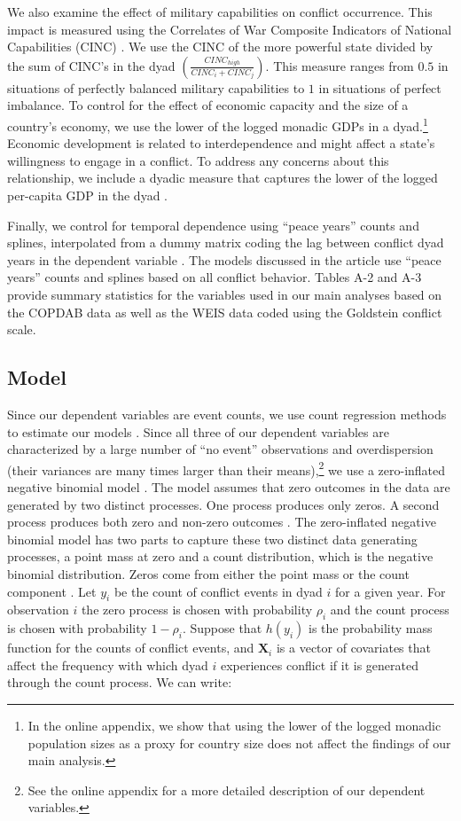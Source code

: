 \documentclass[12pt]{article}
\theoremstyle{hypothesis}
\begin{document}
We also examine the effect of military capabilities on conflict occurrence. This impact is measured using the Correlates of War Composite Indicators of National Capabilities (CINC) \citep{Singer:1987}. We use the CINC of the more powerful state divided by the sum of CINC's in the dyad $\left(\frac{CINC_{high}}{CINC_{i}+CINC_{j}}\right)$. This measure ranges from $0.5$ in situations of perfectly balanced military capabilities to $1$ in situations of perfect imbalance. To control for the effect of economic capacity and the size of a country's economy, we use the lower of the logged monadic GDPs in a dyad.\footnote{In the online appendix, we show that using the lower of the logged monadic population sizes as a proxy for country size does not affect the findings of our main analysis.} Economic development is related to interdependence and might affect a state's willingness to engage in a conflict. To address any concerns about this relationship, we include a dyadic measure that captures the lower of the logged per-capita GDP in the dyad \citep{Oneal:1996,Hegre:2000}.

Finally, we control for temporal dependence using ``peace years'' counts and splines, interpolated from a dummy matrix coding the lag between conflict dyad years in the dependent variable \citep{Beck1998}. The models discussed in the article use ``peace years'' counts and splines based on all conflict behavior. Tables A-2 and A-3 provide summary statistics for the variables used in our main analyses based on the COPDAB data as well as the WEIS data coded using the Goldstein conflict scale.

\subsection*{Model}

Since our dependent variables are event counts, we use count regression methods to estimate our models \citep{Long:1997,Cameron:2013}. Since all three of our dependent variables are characterized by a large number of ``no event'' observations and overdispersion (their variances are many times larger than their means),\footnote{See the online appendix for a more detailed description of our dependent variables.} we use a zero-inflated negative binomial model \citep{Long:1997}. The model assumes that zero outcomes in the data are generated by two distinct processes. One process produces only zeros. A second process produces both zero and non-zero outcomes \citep[242-243]{Long:1997}. The zero-inflated negative binomial model has two parts to capture these two distinct data generating processes, a point mass at zero and a count distribution, which is the negative binomial distribution. Zeros come from either the point mass or the count component \citep[243]{Long:1997}. Let $y_{i}$ be the count of conflict events in dyad $i$ for a given year. For observation $i$ the zero process is chosen with probability $\rho_{i}$ and the count process is chosen with probability $1-\rho_{i}$. Suppose that $h(y_{i})$ is the probability mass function for the counts of conflict events, and $\mathbf{X}_{i}$ is a vector of covariates that affect the frequency with which dyad $i$ experiences conflict if it is generated through the count process. We can write:
\end{document}
